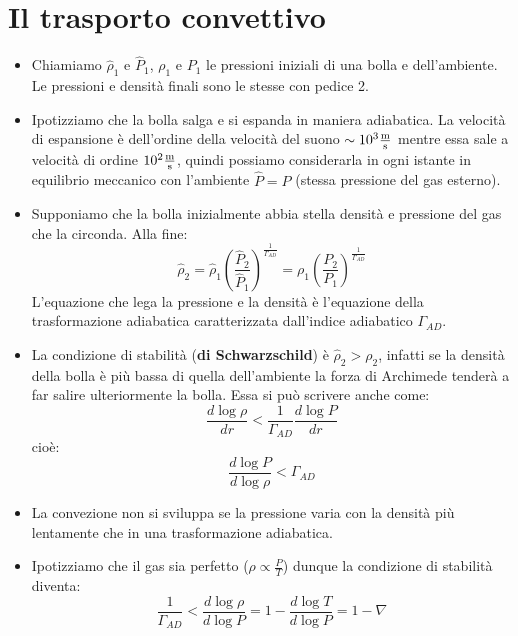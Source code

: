 \documentclass[11pt,a4paper]{article}
\begin{document}
\section{Il trasporto convettivo}

\begin{itemize}

\item Chiamiamo $\hat{\rho}_1$ e $\hat{P}_1$, $\rho_1$ e $P_1$ le pressioni iniziali di una bolla e dell'ambiente.
Le pressioni e densità finali sono le stesse con pedice 2.

\item Ipotizziamo che la bolla salga e si espanda in maniera adiabatica. La velocità di espansione è dell'ordine della velocità del suono $\sim 10^3 \si{\frac{\m}{\s}}$ mentre essa sale a velocità di ordine $10^2 \si{\frac{\meter}{\second}}$, quindi possiamo considerarla in ogni istante in equilibrio meccanico con l'ambiente $\hat{P} = P$ (stessa pressione del gas esterno).

\item Supponiamo che la bolla inizialmente abbia stella densità e pressione del gas che la circonda. Alla fine:
\begin{equation} \hat{\rho}_2 = \hat{\rho}_1 \left( \frac{\hat{P}_2}{\hat{P}_1} \right) ^ {\frac{1}{\Gamma_{AD}}} = \rho_1 \left( \frac{P_2}{P_1} \right) ^ {\frac{1}{\Gamma_{AD}}}
\end{equation}
L'equazione che lega la pressione e la densità è l'equazione della trasformazione adiabatica caratterizzata dall'indice adiabatico $\Gamma_{AD}$.

\item La condizione di stabilità (\textbf{di Schwarzschild}) è $\hat{\rho}_2 > \rho_2$, infatti se la densità della bolla è più bassa di quella dell'ambiente la forza di Archimede tenderà a far salire ulteriormente la bolla. Essa si può scrivere anche come:
\begin{equation}
\frac{d \log \rho}{d r} < \frac{1}{\Gamma_{AD}} \frac{d \log P}{d r}
\end{equation}
cioè:
\begin{equation}
\frac{d \log P}{d \log \rho} < \Gamma_{AD}
\end{equation}

\item La convezione non si sviluppa se la pressione varia con la densità più lentamente che in una trasformazione adiabatica.

\item Ipotizziamo che il gas sia perfetto ($\rho \propto \frac{P}{T}$) dunque la condizione di stabilità diventa:
\begin{equation}
\frac{1}{\Gamma_{AD}} < \frac{d \log \rho}{d \log P } = 1 - \frac{d \log T}{d \log P} = 1 - \nabla
\end{equation}


\end{itemize}
\end{document}
